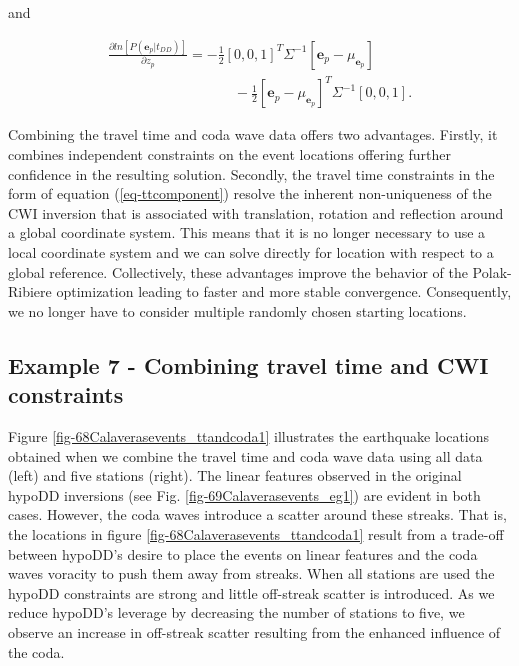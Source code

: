 \documentclass[12pt,double]{article}
\begin{document}
and
\begin{linenomath*} \begin{equation}
\begin{array}{l}
\frac{\partial ln\left[P(\mathbf{e}_p|t_{DD})\right]}{\partial z_p}
= -\frac{1}{2} [0,0,1]^T \Sigma^{-1}
[\mathbf{e}_p-\mu_{\mathbf{e}_p}] \\
\hspace{9em} -\frac{1}{2}
[\mathbf{e}_p-\mu_{\mathbf{e}_p}]^T \Sigma^{-1} [0,0,1].
\end{array}
\end{equation} \end{linenomath*}

Combining the travel time and coda wave data offers two advantages.
Firstly, it combines independent constraints on the event locations
offering further confidence in the resulting solution. Secondly, the
travel time constraints in the form of equation
(\ref{eq-ttcomponent}) resolve the inherent non-uniqueness
of the CWI inversion that is associated with translation, rotation and reflection around a global
coordinate system. This means that it is no longer necessary to use
a local coordinate system and we can solve directly for location
with respect to a global reference. Collectively, these advantages
improve the behavior of the Polak-Ribiere optimization leading to
faster and more stable convergence. Consequently, we no longer have
to consider multiple randomly chosen starting locations.

\vspace{1em}
\subsection*{Example 7 - Combining travel time and CWI constraints}
Figure
\ref{fig-68Calaverasevents_ttandcoda1} illustrates the earthquake
locations obtained when we combine the travel time and coda wave
data using all data (left) and five stations (right). The linear
features observed in the original hypoDD inversions (see Fig.
\ref{fig-69Calaverasevents_eg1}) are evident in both cases. However,
the coda waves introduce a scatter around these streaks. That is,
the locations in figure \ref{fig-68Calaverasevents_ttandcoda1}
result from a trade-off between hypoDD's desire to place the events
on linear features and the coda waves voracity to push them away
from streaks. When all stations are used the hypoDD constraints are
strong and little off-streak scatter is introduced. As we reduce
hypoDD's leverage by decreasing the number of stations to five, we
observe an increase in off-streak scatter resulting from the
enhanced influence of the coda.
\end{document}
